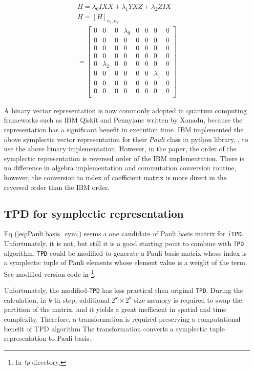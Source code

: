 \documentclass[twocolumn]{article}
\begin{document}
\begin{align}
    H = \lambda_0 IXX + \lambda_1 YXZ + \lambda_2 ZIX\\
    H = [H]_{n_z, n_x} \\
    = \begin{bmatrix}
        0 & 0 & 0& \lambda_0 & 0 & 0 & 0& 0\\
        0 & 0 & 0& 0 & 0 & 0 & 0& 0\\
        0 & 0 & 0& 0 & 0 & 0 & 0& 0\\
        0 & 0 & 0& 0 & 0 & 0 & 0& 0\\
        0 & \lambda_2 & 0& 0 & 0 & 0 & 0& 0\\
        0 & 0 & 0& 0 & 0 & 0 & \lambda_1& 0\\
        0 & 0 & 0& 0 & 0 & 0 & 0& 0\\
        0 & 0 & 0& 0 & 0 & 0 & 0& 0\\
    \end{bmatrix}\label{eq:Pauli basis_sym}
\end{align}

A binary vector representation is now commonly adopted in quantum computing frameworks 
such as IBM Qiskit and Pennylane written by Xanadu, 
because the representation has a significant benefit in execution time.
IBM implemented the above symplectic vector representation 
for their \textit{Pauli} class in python library, ,
to use the above binary implementation\cite{Qiskit}. 
However, in the paper, the order of the symplectic representation 
is reversed order of the IBM implementation. 
There is no difference in algebra implementation and 
commutation conversion routine, however, the conversion to index of coefficient
matrix is more direct in the reversed order than the IBM order.


\subsection{TPD for symplectic representation}

Eq (\ref{eq:Pauli basis_sym}) seems a one candidate of Pauli basis matrix 
for \texttt{iTPD}. Unfortunately, it is not, but still it is a good starting point to combine with \texttt{TPD} algorithm, 
\texttt{TPD} could be modified to generate a Pauli basis matrix
whose index is a symplectic tuple of Pauli elements whose element value is a weight of the term.
See modified version code in \cite{kim_2024}\footnote{In \textit{tp} directory.}.

Unfortunately, the modified-\texttt{TPD} has less practical than 
original \texttt{TPD}.
During the calculation, in $k$-th step, additional $2^k \times 2^k$ size memory 
is required to swap the partition of the matrix, and it yields 
a great inefficient in spatial and time complexity.
Therefore, a transformation is required preserving a computational benefit of TPD algorithm
The transformation converts a symplectic tuple representation to Pauli basis.
\end{document}
